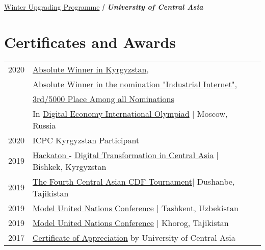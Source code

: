 \documentclass[]{deedy-resume-openfont}
\begin{document}
\begin{minipage}[t]{0.59\textwidth}
\href{https://www.akdn.org/our-agencies/university-central-asia/uca-pre-university-education}{Winter Upgrading Programme} 
{\footnotesize \textit{\textbf{| University of Central Asia}}} \\


\section{Certificates and Awards} 
\begin{tabular}{rll}

2020 & \href{https://drive.google.com/file/d/1qWr5qT-tAZjzCQhJVwCS_91mZGf8PeEm/view?usp=sharing}{Absolute Winner in Kyrgyzstan},\\& \href{https://drive.google.com/file/d/1qWr5qT-tAZjzCQhJVwCS_91mZGf8PeEm/view?usp=sharing}{Absolute Winner in the nomination "Industrial Internet"},\\
&\href{https://drive.google.com/file/d/1qWr5qT-tAZjzCQhJVwCS_91mZGf8PeEm/view?usp=sharing}{3rd/5000 Place Among all Nominations}\\
&In \href{https://olymp.digitaleconomy.world/en/}{Digital Economy International Olympiad} \space| Moscow, Russia\\
2020& ICPC Kyrgyzstan Participant\\

2019&\href{https://drive.google.com/file/d/1oHNS00dwOLS9y1tmq42F8RWxjM2WjFL0/view?usp=sharing}{Hackaton } - \href{https://dtca.kg/}{Digital Transformation in Central Asia} | Bishkek, Kyrgyzstan\\

2019& \href{https://drive.google.com/file/d/1nfR0Lww5Qxti6asNj6nNwK0REmB7b0E8/view?usp=sharing}{The Fourth Central Asian CDF Tournament}| Dushanbe, Tajikistan\\

2019& \href{https://drive.google.com/file/d/1nmrnoNYaSuMe-eunNoyV0LAmya0OgE-D/view?usp=sharing}{Model United Nations Conference} \space | Tashkent, Uzbekistan\\

2019& \href{https://drive.google.com/file/d/1o-GMVCzRXZHLrqYimTdKvgOYd2RdAMj_/view?usp=sharing}{Model United Nations Conference} \space | Khorog, Tajikistan\\

2017& \href{https://drive.google.com/file/d/1o7lv1Rfxlw0AxtvmmHWzMXZlWjPb8xUj/view?usp=sharing}{Certificate of Appreciation} by University of Central Asia\\


\end{tabular}
\end{minipage}
\end{document}
